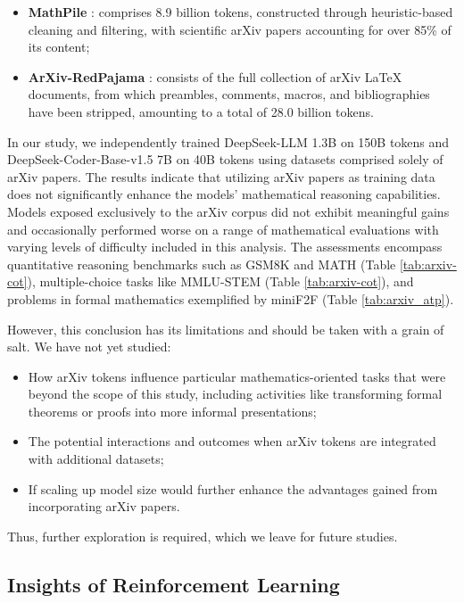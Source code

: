 \begin{itemize}[topsep=0pt]
\begin{itemize}[topsep=0pt]
\begin{itemize}[topsep=0pt]
    \item \textbf{MathPile} \citep{mathpile}: comprises 8.9 billion tokens, constructed through heuristic-based cleaning and filtering, with scientific arXiv papers accounting for over 85\% of its content;
    \item \textbf{ArXiv-RedPajama} \citep{redpajama}: consists of the full collection of arXiv LaTeX documents, from which preambles, comments, macros, and bibliographies have been stripped, amounting to a total of 28.0 billion tokens.
\end{itemize}

In our study, we independently trained DeepSeek-LLM 1.3B on 150B tokens and DeepSeek-Coder-Base-v1.5 7B on 40B tokens using datasets comprised solely of arXiv papers. The results indicate that utilizing arXiv papers as training data does not significantly enhance the models' mathematical reasoning capabilities. Models exposed exclusively to the arXiv corpus did not exhibit meaningful gains and occasionally performed worse on a range of mathematical evaluations with varying levels of difficulty included in this analysis. The assessments encompass quantitative reasoning benchmarks such as GSM8K and MATH (Table \ref{tab:arxiv-cot}), multiple-choice tasks like MMLU-STEM (Table \ref{tab:arxiv-cot}), and problems in formal mathematics exemplified by miniF2F (Table \ref{tab:arxiv_atp}).

However, this conclusion has its limitations and should be taken with a grain of salt. We have not yet studied:

\begin{itemize}[topsep=0pt]
    \item How arXiv tokens influence particular mathematics-oriented tasks that were beyond the scope of this study, including activities like transforming formal theorems or proofs into more informal presentations;
    \item The potential interactions and outcomes when arXiv tokens are integrated with additional datasets;
    \item If scaling up model size would further enhance the advantages gained from incorporating arXiv papers.
\end{itemize}

Thus, further exploration is required, which we leave for future studies.

\subsection{Insights of Reinforcement Learning}

\end{itemize}
\end{itemize}

